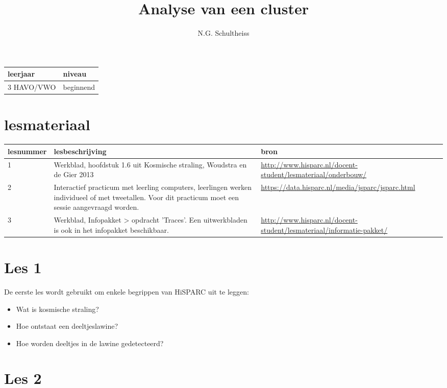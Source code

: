 

\title{Analyse van een cluster}
\author{N.G. Schultheiss}



\maketitle

\begin{tabular}{|>{\raggedright}p{3cm}|>{\raggedright}p{12cm}|}
\hline
leerjaar & niveau \tabularnewline
\hline
3 HAVO/VWO & beginnend \tabularnewline
\hline
\end{tabular}

\section{lesmateriaal}

\begin{tabular}{ |>{\raggedright}p{2.5cm}|>{\raggedright}p{8cm}|>{\raggedright}p{4cm}|}
\hline
lesnummer & lesbeschrijving & bron \tabularnewline
\hline
1 & 
Werkblad, hoofdstuk 1.6 uit Kosmische straling, Woudstra en de Gier 2013 & 
\url{http://www.hisparc.nl/docent-student/lesmateriaal/onderbouw/} \tabularnewline
\hline
2 & 
Interactief practicum met leerling computers, leerlingen werken individueel of met tweetallen. Voor dit practicum moet een sessie aangevraagd worden. &
\url{https://data.hisparc.nl/media/jsparc/jsparc.html} \tabularnewline
\hline
3 & 
Werkblad, Infopakket > opdracht 'Traces'. Een uitwerkbladen is ook in het infopakket beschikbaar. & 
\url{http://www.hisparc.nl/docent-student/lesmateriaal/informatie-pakket/} \tabularnewline
\hline
\end{tabular}

\section{Les 1}

De eerste les wordt gebruikt om enkele begrippen van HiSPARC uit te leggen:

\begin{itemize}
\item Wat is kosmische straling?
\item Hoe ontstaat een deeltjeslawine?
\item Hoe worden deeltjes in de lawine gedetecteerd?
\end{itemize}

\section{Les 2}

